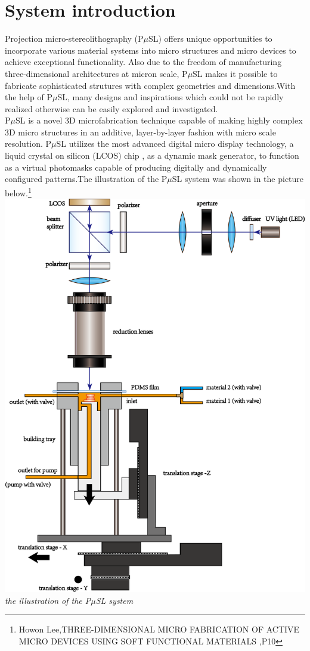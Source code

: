 \documentclass[a4paper]{article}
\begin{document}
\section{System introduction}
Projection micro-stereolithography (P$\mu$SL) offers unique opportunities to incorporate various material systems into
micro structures and micro devices to achieve exceptional functionality. Also due to the freedom of manufacturing 
three-dimensional architectures at micron scale, P$\mu$SL makes it possible to fabricate sophisticated strutures with 
complex geometries and dimensions.With the help of P$\mu$SL, many designs and inspirations which could not be rapidly 
realized otherwise can be easily explored and investigated.  \\
\vspace{20pt}
P$\mu$SL is a novel 3D microfabrication technique capable of making highly complex 3D micro structures in an additive, 
layer-by-layer fashion with micro scale resolution. P$\mu$SL utilizes the most advanced digital micro display technology, 
a liquid crystal on silicon (LCOS) chip , as a dynamic mask generator, to function as a virtual photomasks capable of 
producing digitally and dynamically configured patterns.The illustration of the P$\mu$SL system was shown in the picture 
below.\footnote{Howon Lee,THREE-DIMENSIONAL MICRO FABRICATION OF ACTIVE MICRO DEVICES USING SOFT FUNCTIONAL MATERIALS
  ,P10}\\
\vspace{20pt}
\centering
\includegraphics[width=400pt]{overview.png}\\
\textit{the illustration of the P$\mu$SL system}
\vspace{20pt}
\pagebreak
\end{document}
